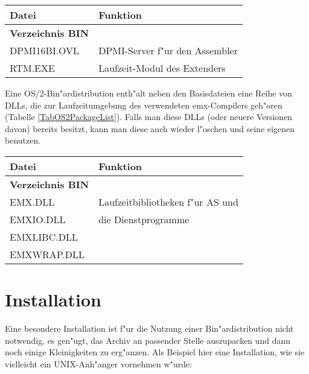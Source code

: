 \documentclass[12pt,a4paper,twoside]{report}
\begin{document}
\begin{table*}[htp]
\begin{center}\begin{tabular}{|l|l|}
\hline
Datei             & Funktion \\
\hline
\hline
{\bf Verzeichnis BIN} & \\
\hline
DPMI16BI.OVL   & DPMI-Server f"ur den Assembler \\
RTM.EXE        & Laufzeit-Modul des Extenders \\
\hline
\end{tabular}\end{center}
\caption{Zus"atzliche Dateien in einer DPMI-Bin"ardistribution
         \label{TabDPMIPackageList}}
\end{table*}

Eine OS/2-Bin"ardistribution  enth"alt neben den
Basisdateien eine Reihe von DLLs, die zur Laufzeitumgebung des verwendeten
emx-Compilers geh"oren (Tabelle \ref{TabOS2PackageList}).  Falls man diese
DLLs (oder neuere Versionen davon) bereits besitzt, kann man diese auch
wieder l"oschen und seine eigenen benutzen.

\begin{table*}[htp]
\begin{center}\begin{tabular}{|l|l|}
\hline
Datei             & Funktion \\
\hline
\hline
{\bf Verzeichnis BIN} & \\
\hline
EMX.DLL           & Laufzeitbibliotheken f"ur AS und \\
EMXIO.DLL         & die Dienstprogramme \\
EMXLIBC.DLL       & \\
EMXWRAP.DLL       & \\
\hline
\end{tabular}\end{center}
\caption{Zus"atzliche Dateien in einer OS/2-Bin"ardistribution
         \label{TabOS2PackageList}}
\end{table*}


\section{Installation}

Eine besondere  Installation ist f"ur die Nutzung 
einer Bin"ardistribution nicht notwendig, es gen"ugt, das Archiv an
passender Stelle auszupacken und dann noch einige Kleinigkeiten zu
erg"anzen.  Als Beispiel hier eine Installation, wie sie vielleicht
ein UNIX-Anh"anger vornehmen w"urde:
\end{document}
